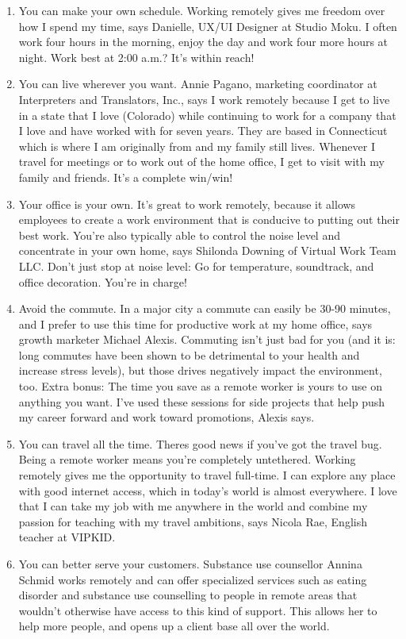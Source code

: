 \documentclass[]{book}
\begin{document}
\begin{enumerate}
\item
  You can make your own schedule. Working remotely gives me freedom over how I spend my time, says Danielle, UX/UI Designer at Studio Moku. I often work four hours in the morning, enjoy the day and work four more hours at night. Work best at 2:00 a.m.? It's within reach!
\item
  You can live wherever you want. Annie Pagano, marketing coordinator at Interpreters and Translators, Inc., says I work remotely because I get to live in a state that I love (Colorado) while continuing to work for a company that I love and have worked with for seven years. They are based in Connecticut which is where I am originally from and my family still lives. Whenever I travel for meetings or to work out of the home office, I get to visit with my family and friends. It's a complete win/win!
\item
  Your office is your own. It's great to work remotely, because it allows employees to create a work environment that is conducive to putting out their best work. You're also typically able to control the noise level and concentrate in your own home, says Shilonda Downing of Virtual Work Team LLC. Don't just stop at noise level: Go for temperature, soundtrack, and office decoration. You're in charge!
\item
  Avoid the commute. In a major city a commute can easily be 30-90 minutes, and I prefer to use this time for productive work at my home office, says growth marketer Michael Alexis. Commuting isn't just bad for you (and it is: long commutes have been shown to be detrimental to your health and increase stress levels), but those drives negatively impact the environment, too. Extra bonus: The time you save as a remote worker is yours to use on anything you want. I've used these sessions for side projects that help push my career forward and work toward promotions, Alexis says.
\item
  You can travel all the time. Theres good news if you've got the travel bug. Being a remote worker means you're completely untethered. Working remotely gives me the opportunity to travel full-time. I can explore any place with good internet access, which in today's world is almost everywhere. I love that I can take my job with me anywhere in the world and combine my passion for teaching with my travel ambitions, says Nicola Rae, English teacher at VIPKID.
\item
  You can better serve your customers. Substance use counsellor Annina Schmid works remotely and can offer specialized services such as eating disorder and substance use counselling to people in remote areas that wouldn't otherwise have access to this kind of support. This allows her to help more people, and opens up a client base all over the world.

\end{enumerate}
\end{document}
